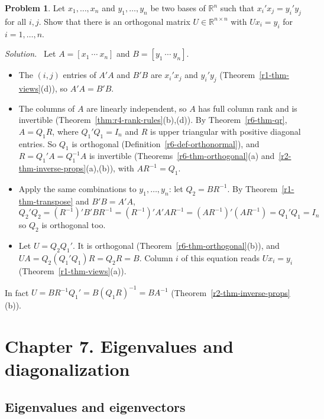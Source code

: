 \documentclass[12pt]{article}
\def\unitnumber{1}
\newcommand{\R}{\mathbb R}
\theoremstyle{definition}
\newtheorem{problem}{Problem}
\newenvironment{solution}{\par\noindent\textit{Solution.}\ }{\par\smallskip}
\begin{document}
\begin{problem}\label{r6-ex-pr-gram}
Let \(x_1,\dots,x_n\) and \(y_1,\dots,y_n\) be two bases of \(\R^n\) such that \(x_i'x_j=y_i'y_j\) for all \(i,j\).
Show that there is an orthogonal matrix \(U\in\R^{n\times n}\) with \(Ux_i=y_i\) for \(i=1,\dots,n\).
\end{problem}
\begin{solution}
Let \(A=[x_1\ \cdots\ x_n]\) and \(B=[y_1\ \cdots\ y_n]\).
\begin{itemize}
\item The \((i,j)\) entries of \(A'A\) and \(B'B\) are \(x_i'x_j\) and \(y_i'y_j\) (Theorem~\ref{r1-thm-views}(d)), so
\(A'A=B'B\).
\item The columns of \(A\) are linearly independent, so \(A\) has full column rank and is invertible
(Theorem~\ref{thm:r4-rank-rules}(b),(d)). By Theorem~\ref{r6-thm-qr}, \(A=Q_1R\), where \(Q_1'Q_1=I_n\) and \(R\) is upper
triangular with positive diagonal entries. So \(Q_1\) is orthogonal (Definition~\ref{r6-def-orthonormal}), and
\(R=Q_1'A=Q_1^{-1}A\) is invertible (Theorems~\ref{r6-thm-orthogonal}(a) and~\ref{r2-thm-inverse-props}(a),(b)), with
\(AR^{-1}=Q_1\).
\item Apply the same combinations to \(y_1,\dots,y_n\): let \(Q_2=BR^{-1}\). By Theorem~\ref{r1-thm-transpose} and
\(B'B=A'A\),
\[
Q_2'Q_2=(R^{-1})'B'BR^{-1}=(R^{-1})'A'AR^{-1}=(AR^{-1})'(AR^{-1})=Q_1'Q_1=I_n
\]
so \(Q_2\) is orthogonal too.
\item Let \(U=Q_2Q_1'\). It is orthogonal (Theorem~\ref{r6-thm-orthogonal}(b)), and \(UA=Q_2(Q_1'Q_1)R=Q_2R=B\). Column
\(i\) of this equation reads \(Ux_i=y_i\) (Theorem~\ref{r1-thm-views}(a)).
\end{itemize}
In fact \(U=BR^{-1}Q_1'=B(Q_1R)^{-1}=BA^{-1}\) (Theorem~\ref{r2-thm-inverse-props}(b)).
\end{solution}

\clearpage
\def\unitnumber{7}
\setcounter{theorem}{0}\setcounter{problem}{0}
\section*{Chapter 7. Eigenvalues and diagonalization}

\subsection*{Eigenvalues and eigenvectors}
\end{document}
